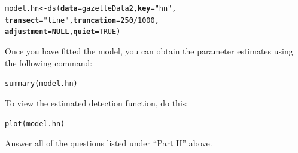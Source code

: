 \documentclass[12pt]{article}\usepackage[]{graphicx}\usepackage[]{color}
\makeatletter
\newcommand{\hlnum}[1]{\textcolor[rgb]{0.69,0.494,0}{#1}}%
\newcommand{\hlstr}[1]{\textcolor[rgb]{0.749,0.012,0.012}{#1}}%
\newcommand{\hlopt}[1]{\textcolor[rgb]{0,0,0}{#1}}%
\newcommand{\hlstd}[1]{\textcolor[rgb]{0,0,0}{#1}}%
\newcommand{\hlkwa}[1]{\textcolor[rgb]{0,0,0}{\textbf{#1}}}%
\newcommand{\hlkwb}[1]{\textcolor[rgb]{0,0.341,0.682}{#1}}%
\newcommand{\hlkwc}[1]{\textcolor[rgb]{0,0,0}{\textbf{#1}}}%
\newcommand{\hlkwd}[1]{\textcolor[rgb]{0.004,0.004,0.506}{#1}}%
\newenvironment{kframe}{%
 \def\at@end@of@kframe{}%
 \ifinner\ifhmode%
  \def\at@end@of@kframe{\end{minipage}}%
  \begin{minipage}{\columnwidth}%
 \fi\fi%
 \def\FrameCommand##1{\hskip\@totalleftmargin \hskip-\fboxsep
 \colorbox{shadecolor}{##1}\hskip-\fboxsep
     \hskip-\linewidth \hskip-\@totalleftmargin \hskip\columnwidth}%
 \MakeFramed {\advance\hsize-\width
   \@totalleftmargin\z@ \linewidth\hsize
   \@setminipage}}%
 {\par\unskip\endMakeFramed%
 \at@end@of@kframe}
\newenvironment{knitrout}{}{} %
\makeatother
\begin{document}
\begin{knitrout}
\color{fgcolor}\begin{kframe}
\begin{alltt}
\hlstd{model.hn} \hlkwb{<-} \hlkwd{ds}\hlstd{(}\hlkwc{data}\hlstd{=gazelleData2,} \hlkwc{key}\hlstd{=}\hlstr{"hn"}\hlstd{,}
               \hlkwc{transect}\hlstd{=}\hlstr{"line"}\hlstd{,} \hlkwc{truncation}\hlstd{=}\hlnum{250}\hlopt{/}\hlnum{1000}\hlstd{,}
               \hlkwc{adjustment}\hlstd{=}\hlkwa{NULL}\hlstd{,} \hlkwc{quiet}\hlstd{=}\hlnum{TRUE}\hlstd{)}
\end{alltt}


{\ttfamily\noindent\itshape\color{messagecolor}{\#\# Fitting half-normal key function}}

{\ttfamily\noindent\itshape\color{messagecolor}{\#\# Key only model: not constraining for monotonicity.}}

{\ttfamily\noindent\itshape\color{messagecolor}{\#\# AIC= -430.39}}\end{kframe}
\end{knitrout}

Once you have fitted the model, you can obtain the parameter estimates
using the following command:

\begin{knitrout}
\color{fgcolor}\begin{kframe}
\begin{alltt}
\hlkwd{summary}\hlstd{(model.hn)}
\end{alltt}
\end{kframe}
\end{knitrout}

To view the estimated detection function, do this:

\begin{knitrout}
\color{fgcolor}\begin{kframe}
\begin{alltt}
\hlkwd{plot}\hlstd{(model.hn)}
\end{alltt}
\end{kframe}
\end{knitrout}


Answer all of the questions listed under ``Part II'' above.
\end{document}
